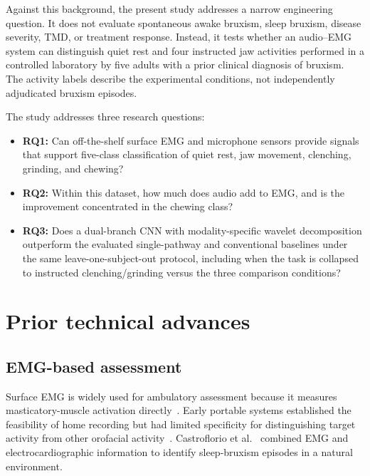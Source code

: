 \documentclass[pdflatex,sn-nature,iicol]{sn-jnl}
\begin{document}
\color{blue}
Against this background, the present study addresses a narrow engineering question. It does not evaluate spontaneous awake bruxism, sleep bruxism, disease severity, TMD, or treatment response. Instead, it tests whether an audio--EMG system can distinguish quiet rest and four instructed jaw activities performed in a controlled laboratory by five adults with a prior clinical diagnosis of bruxism. The activity labels describe the experimental conditions, not independently adjudicated bruxism episodes.
\color{black}

\color{blue}
The study addresses three research questions:
\color{black}

\begin{itemize}
\color{blue}
    \item \textbf{RQ1:} Can off-the-shelf surface EMG and microphone sensors provide signals that support five-class classification of quiet rest, jaw movement, clenching, grinding, and chewing?
    \item \textbf{RQ2:} Within this dataset, how much does audio add to EMG, and is the improvement concentrated in the chewing class?
    \item \textbf{RQ3:} Does a dual-branch CNN with modality-specific wavelet decomposition outperform the evaluated single-pathway and conventional baselines under the same leave-one-subject-out protocol, including when the task is collapsed to instructed clenching/grinding versus the three comparison conditions?
\color{black}
\end{itemize}

\color{black}
\section{Prior technical advances}

\color{blue}
\subsection{EMG-based assessment}
\color{black}

\color{blue}
Surface EMG is widely used for ambulatory assessment because it measures masticatory-muscle activation directly~\cite{raez2006techniques}. Early portable systems established the feasibility of home recording but had limited specificity for distinguishing target activity from other orofacial activity~\cite{stuginski2016detection}. Castroflorio et al.~\cite{castroflorio2013use} combined EMG and electrocardiographic information to identify sleep-bruxism episodes in a natural environment.
\color{black}
\end{document}
